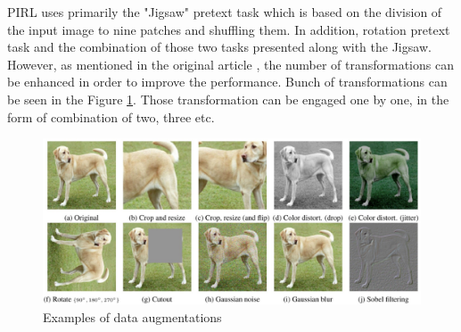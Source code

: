 \documentclass[conference]{IEEEtran}
\begin{document}
PIRL uses primarily the "Jigsaw" pretext task which is based on the division of the input image to nine patches and shuffling them. In addition, rotation pretext task and the combination of those two tasks presented along with the Jigsaw. However, as mentioned in the original article \cite{PIRL}, the number of transformations can be enhanced in order to improve the performance. Bunch of transformations can be seen in the Figure \ref{fig2}. Those transformation can be engaged one by one, in the form of combination of two, three etc. 
\begin{figure}[h]
\includegraphics[width=\textwidth]{fig2.jpg}
\centering
\caption{Examples of data augmentations \cite{SimCLR}}
\label{fig2}
\end{figure}
\end{document}
